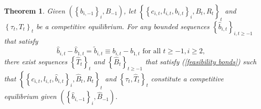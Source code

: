 \documentclass[thmsb,11pt]{article}
\newtheorem{theorem}{Theorem}
\begin{document}

\begin{theorem}
\label{theorem: main} Given $\left( \left \{ b_{i,-1}\right \}
_{i},B_{-1}\right) $, let $\left \{ \left \{ c_{i,t},l_{i,t},b_{i,t}\right \} _{i},B_{t},R_{t}\right \} _{t} $ and $\left \{ \tau _{t},T_{t}\right
\} _{t}$ be a competitive equilibrium. For any bounded sequences $%
\left \{ \hat{b}_{i,t}\right \} _{i,t\geq -1}$ that satisfy
\begin{equation*}
\hat{b}_{i,t}-\hat{b}_{1,t}=\tilde{b}_{i,t}\equiv b_{i,t}	-b_{1,t}\text{ for all }t\geq -1,i\geq 2,
\end{equation*}%
there exist  sequences $\left \{ \hat{T}_{t}\right \} _{t}$ and $%
\left \{ \hat{B}_{t}\right \} _{t\geq -1}$ that satisfy (\ref{feasibility
bonds}) such that $\left \{ \left \{ c_{i,t},l_{i,t},\hat{b}%
_{i,t}\right \} _{i},\hat{B}_{t},R_{t}\right \} _{t}$ and $\left \{
\tau _{t},\hat{T}_{t}\right \} _{t}$ constitute a competitive
equilibrium given $\left( \left \{ \hat{b}_{i,-1}\right \} _{i},\hat{B}%
_{-1}\right) $.
\end{theorem}
\end{document}
